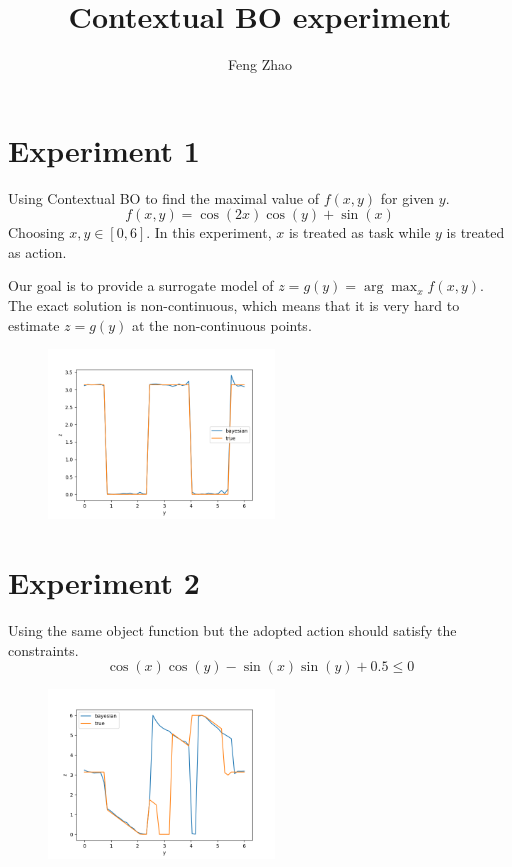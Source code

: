 \documentclass{article}
\title{Contextual BO experiment}
\author{Feng Zhao}
\begin{document}
\maketitle
\section{Experiment 1}
Using Contextual BO to find the maximal value of $f(x,y)$ for given $y$.
\begin{equation}\label{eq:f}
    f(x,y) = \cos(2 x) \cos(y) + \sin(x)
\end{equation}
Choosing $x,y \in [0,6]$.
In this experiment, $x$ is treated as task while $y$ is treated
as action.

Our goal is to provide a surrogate model of $z=g(y)=\arg\max_{x} f(x,y)$.
The exact solution is non-continuous, which means that it is very hard to estimate $z=g(y)$ at the
non-continuous points.
\begin{figure}[!ht]
    \centering
    \includegraphics[width=6cm]{cbo_1.png}
\end{figure}
\section{Experiment 2}
Using the same object function but the adopted action should
satisfy the constraints.
\begin{equation}
    \cos(x)  \cos(y) - \sin(x) \sin(y) + 0.5 \leq 0    
\end{equation}
\begin{figure}[!ht]
    \centering
    \includegraphics[width=6cm]{cbo_2.png}
\end{figure}
\end{document}
